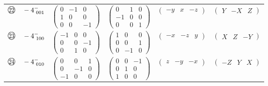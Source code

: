 \documentclass[fleqn,10pt,landscape]{jsarticle}
\begin{document}
\begin{center}
\begin{longtable}{lcccc}
$ {\ooalign{\hfil\resizebox{.8\width}{\height}{22}\hfil\crcr\raise.1ex\hbox{\large$\bigcirc$}}}\quad -4^{-}_{\,\,001} $ & $ \begin{pmatrix} 0 & -1 & 0 \\ 1 & 0 & 0 \\ 0 & 0 & -1 \end{pmatrix} $ & $ \begin{pmatrix} 0 & 1 & 0 \\ -1 & 0 & 0 \\ 0 & 0 & 1 \end{pmatrix} $ & $ \begin{pmatrix} - y & x & - z \end{pmatrix} $ & $ \begin{pmatrix} Y & - X & Z \end{pmatrix} $ \\
$ {\ooalign{\hfil\resizebox{.8\width}{\height}{23}\hfil\crcr\raise.1ex\hbox{\large$\bigcirc$}}}\quad -4^{-}_{\,\,100} $ & $ \begin{pmatrix} -1 & 0 & 0 \\ 0 & 0 & -1 \\ 0 & 1 & 0 \end{pmatrix} $ & $ \begin{pmatrix} 1 & 0 & 0 \\ 0 & 0 & 1 \\ 0 & -1 & 0 \end{pmatrix} $ & $ \begin{pmatrix} - x & - z & y \end{pmatrix} $ & $ \begin{pmatrix} X & Z & - Y \end{pmatrix} $ \\
$ {\ooalign{\hfil\resizebox{.8\width}{\height}{24}\hfil\crcr\raise.1ex\hbox{\large$\bigcirc$}}}\quad -4^{-}_{\,\,010} $ & $ \begin{pmatrix} 0 & 0 & 1 \\ 0 & -1 & 0 \\ -1 & 0 & 0 \end{pmatrix} $ & $ \begin{pmatrix} 0 & 0 & -1 \\ 0 & 1 & 0 \\ 1 & 0 & 0 \end{pmatrix} $ & $ \begin{pmatrix} z & - y & - x \end{pmatrix} $ & $ \begin{pmatrix} - Z & Y & X \end{pmatrix} $ \\
\end{longtable}
\end{center}
\end{document}
